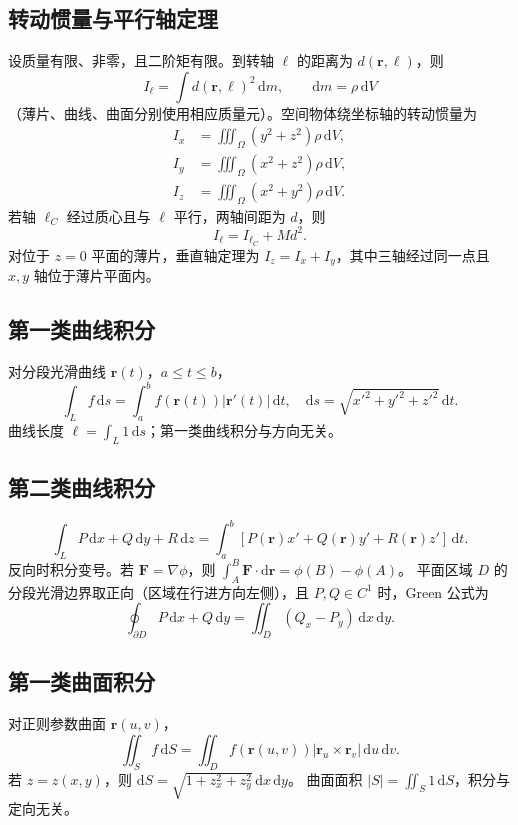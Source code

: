 \documentclass[../main.tex]{subfiles}
\begin{document}
\subsection{转动惯量与平行轴定理}
设质量有限、非零，且二阶矩有限。到转轴 $\ell$ 的距离为 $d(\bm r,\ell)$，则
\[
I_\ell=\int d(\bm r,\ell)^2\,\mathrm dm,
\qquad\mathrm dm=\rho\,\mathrm dV
\]
（薄片、曲线、曲面分别使用相应质量元）。空间物体绕坐标轴的转动惯量为
\begin{align*}
I_x&=\iiint_\Omega(y^2+z^2)\rho\,\mathrm dV,\\
I_y&=\iiint_\Omega(x^2+z^2)\rho\,\mathrm dV,\\
I_z&=\iiint_\Omega(x^2+y^2)\rho\,\mathrm dV.
\end{align*}
若轴 $\ell_C$ 经过质心且与 $\ell$ 平行，两轴间距为 $d$，则
\[
I_\ell=I_{\ell_C}+Md^2.
\]
对位于 $z=0$ 平面的薄片，垂直轴定理为 $I_z=I_x+I_y$，其中三轴经过同一点且 $x,y$ 轴位于薄片平面内。
\subsection{第一类曲线积分}
\par\pagebreak[0]\begin{samepage}
对分段光滑曲线 $\bm r(t)$，$a\le t\le b$，
\[
\int_L f\,\mathrm ds=\int_a^b f(\bm r(t))|\bm r'(t)|\,\mathrm dt,
\quad \mathrm ds=\sqrt{x'^2+y'^2+z'^2}\,\mathrm dt.
\]
曲线长度 $\ell=\int_L1\,\mathrm ds$；第一类曲线积分与方向无关。
\par\end{samepage}\pagebreak[0]
\subsection{第二类曲线积分}
\[
\int_L P\,\mathrm dx+Q\,\mathrm dy+R\,\mathrm dz
=\int_a^b[P(\bm r)x'+Q(\bm r)y'+R(\bm r)z']\,\mathrm dt.
\]
反向时积分变号。若 $\bm F=\nabla\phi$，则 $\int_A^B\bm F\cdot\mathrm d\bm r=\phi(B)-\phi(A)$。
平面区域 $D$ 的分段光滑边界取正向（区域在行进方向左侧），且 $P,Q\in C^1$ 时，Green 公式为
\[
\oint_{\partial D}P\,\mathrm dx+Q\,\mathrm dy
=\iint_D(Q_x-P_y)\,\mathrm dx\,\mathrm dy.
\]
\subsection{第一类曲面积分}
对正则参数曲面 $\bm r(u,v)$，
\[
\iint_S f\,\mathrm dS=\iint_D f(\bm r(u,v))|\bm r_u\times\bm r_v|\,\mathrm du\,\mathrm dv.
\]
若 $z=z(x,y)$，则 $\mathrm dS=\sqrt{1+z_x^2+z_y^2}\,\mathrm dx\,\mathrm dy$。
曲面面积 $|S|=\iint_S1\,\mathrm dS$，积分与定向无关。
\end{document}
